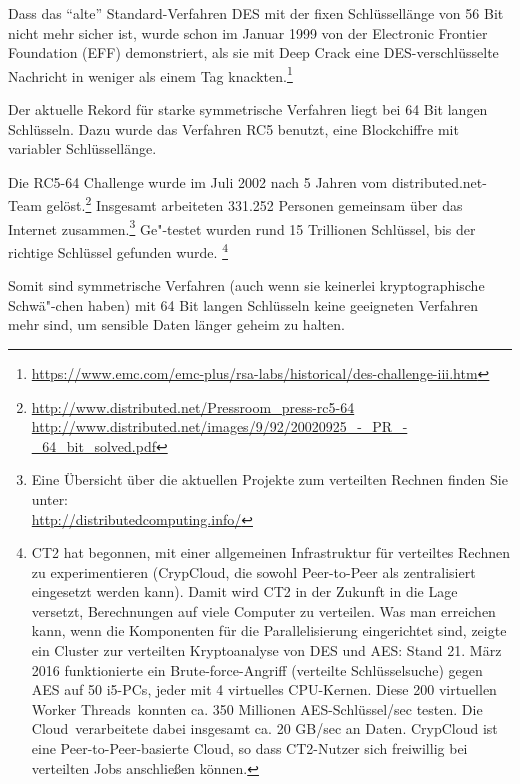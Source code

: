 Dass das "`alte"' Standard-Verfahren DES mit der fixen Schlüssellänge
von 56 Bit nicht mehr sicher ist, wurde schon im Januar 1999 von der
Electronic Frontier Foundation (EFF) demonstriert, als sie mit Deep Crack
eine DES-verschlüsselte Nachricht in weniger als einem Tag
knackten.\footnote{%
  \url{https://www.emc.com/emc-plus/rsa-labs/historical/des-challenge-iii.htm}
}

Der aktuelle Rekord für starke symmetrische Verfahren liegt bei 64 Bit
langen Schlüsseln. Dazu wurde das Verfahren RC5 benutzt, eine
Blockchiffre mit variabler Schlüssellänge. 

Die RC5-64 Challenge wurde im Juli 2002 nach 5 Jahren vom
distributed.net-Team gelöst.\footnote{%
 \url{http://www.distributed.net/Pressroom_press-rc5-64}\\
 \url{http://www.distributed.net/images/9/92/20020925_-_PR_-_64_bit_solved.pdf}
}
Insgesamt arbeiteten 331.252 Personen gemeinsam über das Internet
zusammen.\footnote{%
Eine Übersicht über die aktuellen Projekte zum verteilten Rechnen finden
Sie unter:\\
\url{http://distributedcomputing.info/}
}
Ge"-testet wurden rund 15 Trillionen Schlüssel, bis der
richtige Schlüssel gefunden wurde.%
\footnote{%
  CT2 hat begonnen, mit einer allgemeinen Infrastruktur für verteiltes
  Rechnen zu experimentieren (CrypCloud, die sowohl Peer-to-Peer
  als zentralisiert eingesetzt werden kann). Damit wird CT2 in der Zukunft in die
  Lage versetzt, Berechnungen auf viele Computer zu verteilen.
  Was man erreichen kann, wenn die Komponenten für die Parallelisierung eingerichtet
  sind, zeigte ein Cluster zur verteilten Kryptoanalyse von DES und AES:
  Stand 21. März 2016 funktionierte ein Brute-force-Angriff (verteilte Schlüsselsuche)
  gegen AES auf 50 i5-PCs, jeder mit 4 virtuelles CPU-Kernen. Diese 200 virtuellen
  \glqq Worker Threads\grqq~konnten ca. 350 Millionen AES-Schlüssel/sec testen. Die
  \glqq Cloud\grqq~verarbeitete dabei insgesamt ca. 20 GB/sec an Daten. CrypCloud
  ist eine Peer-to-Peer-basierte Cloud, so dass CT2-Nutzer sich freiwillig bei
  verteilten Jobs anschließen können.
}


Somit sind symmetrische Verfahren (auch wenn sie keinerlei
kryptographische Schwä"-chen haben) mit 64 Bit langen Schlüsseln
keine geeigneten Verfahren mehr sind, um sensible Daten länger geheim
zu halten.




\newpage
